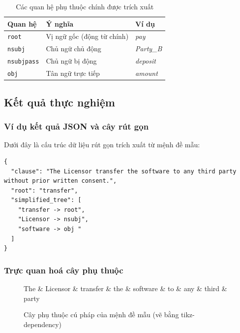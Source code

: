 \begin{table}[H]
    \centering
    \caption{Các quan hệ phụ thuộc chính được trích xuất}
    \label{tab:dep-key-rels}
    \begin{tabular}{|l|l|l|}
        \hline
        \textbf{Quan hệ} & \textbf{Ý nghĩa} & \textbf{Ví dụ} \\
        \hline
        \texttt{root}       & Vị ngữ gốc (động từ chính) & \textit{pay}     \\
        \texttt{nsubj}      & Chủ ngữ chủ động           & \textit{Party\_B} \\
        \texttt{nsubjpass}  & Chủ ngữ bị động            & \textit{deposit} \\
        \texttt{obj}        & Tân ngữ trực tiếp          & \textit{amount}  \\
        \hline
    \end{tabular}
\end{table}

\subsection{Kết quả thực nghiệm}

\subsubsection{Ví dụ kết quả JSON và cây rút gọn}

Dưới đây là cấu trúc dữ liệu rút gọn trích xuất từ mệnh đề mẫu:

\begin{verbatim}
{
  "clause": "The Licensor transfer the software to any third party without prior written consent.",
  "root": "transfer",
  "simplified_tree": [
    "transfer -> root",
    "Licensor -> nsubj",
    "software -> obj "
  ]
}
\end{verbatim}
\subsubsection{Trực quan hoá cây phụ thuộc}

\begin{figure}[H]
\centering
\begin{dependency}[theme = simple]
    \begin{deptext}[column sep=0.5cm]
        The \& Licensor \& transfer \& the \& software \& to \& any \& third \& party \\
    \end{deptext}
\end{dependency}
\caption{Cây phụ thuộc cú pháp của mệnh đề mẫu (vẽ bằng tikz-dependency)}
\label{fig:dep-tree}
\end{figure}

